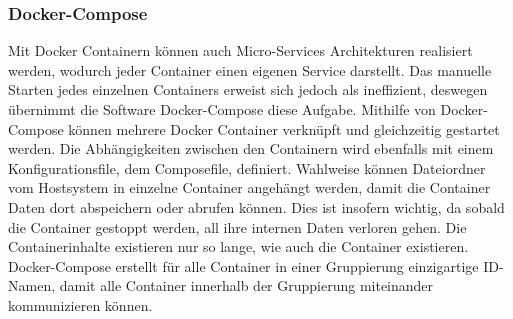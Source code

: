 \subsubsection{Docker-Compose}
Mit Docker Containern können auch Micro-Services Architekturen realisiert werden, wodurch jeder Container einen eigenen Service darstellt.
Das manuelle Starten jedes einzelnen Containers erweist sich jedoch als ineffizient, deswegen übernimmt die Software \glqq Docker-Compose\grqq{} diese Aufgabe.
Mithilfe von Docker-Compose können mehrere Docker Container verknüpft und gleichzeitig gestartet werden.
Die Abhängigkeiten zwischen den Containern wird ebenfalls mit einem Konfigurationsfile, dem Composefile, definiert.
Wahlweise können Dateiordner vom Hostsystem in einzelne Container angehängt werden, damit die Container Daten dort abspeichern oder abrufen können.
Dies ist insofern wichtig, da sobald die Container gestoppt werden, all ihre internen Daten verloren gehen.
Die Containerinhalte existieren nur so lange, wie auch die Container existieren.
Docker-Compose erstellt für alle Container in einer Gruppierung einzigartige ID-Namen, damit alle Container innerhalb der Gruppierung miteinander kommunizieren können.
